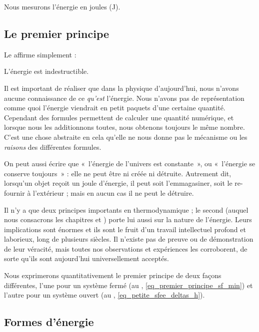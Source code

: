		Nous mesurons l’énergie en \si{joules} (\si{\joule}). 
	
	\subsection{Le premier principe}
		\label{ch_premier_principe}

		Le  affirme simplement :

		\begin{principe}
				L’énergie est indestructible.
		\end{principe}

			Il est important de réaliser que dans la physique d’aujourd’hui, nous n’avons aucune connaissance de ce \emph{qu’est} l’énergie. Nous n’avons pas de représentation comme quoi l’énergie viendrait en petit paquets d’une certaine quantité. Cependant des formules permettent de calculer une quantité numérique, et lorsque nous les additionnons toutes, nous obtenons toujours le même nombre. C’est une chose abstraite en cela qu’elle ne nous donne pas le mécanisme ou les \emph{raisons} des différentes formules.

		On peut aussi écrire que «~l’énergie de l’univers est constante~», ou «~l’énergie se conserve toujours~» : elle ne peut être ni créée ni détruite. Autrement dit, lorsqu’un objet reçoit un \si{joule} d’énergie, il peut soit l’emmagasiner, soit le re-fournir à l’extérieur ; mais en aucun cas il ne peut le détruire.

		Il n’y a que deux principes importants en thermodynamique ; le second (auquel nous consacrons les chapitres \sept et \huit) porte lui aussi sur la nature de l’énergie. Leurs implications sont énormes et ils sont le fruit d’un travail intellectuel profond et laborieux, long de plusieurs siècles. Il n’existe pas de preuve ou de démonstration de leur véracité, mais toutes nos observations et expériences les corroborent, de sorte qu’ils sont aujourd’hui universellement acceptés.
		
		Nous exprimerons quantitativement le premier principe de deux façons différentes, l’une pour un système fermé (au \coursdeuxshort, \cref{eq_premier_principe_sf_min}) et l’autre pour un système ouvert (au \courstroisshort, \cref{eq_petite_sfee_deltas_h}).
	
	
	\subsection{Formes d’énergie}
	

